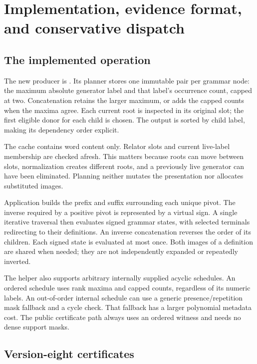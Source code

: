\section{Implementation, evidence format, and conservative dispatch}
\label{sec:implementation}

\subsection{The implemented operation}

The new producer is . Its planner stores
one immutable pair per grammar node: the maximum absolute generator label
and that label's occurrence count, capped at two. Concatenation retains the
larger maximum, or adds the capped counts when the maxima agree. Each
current root is inspected in its original slot; the first eligible donor
for each child is chosen. The output is sorted by child label, making its
dependency order explicit.

The cache contains word content only. Relator slots and current live-label
membership are checked afresh. This matters because roots can move between
slots, normalization creates different roots, and a previously live
generator can have been eliminated. Planning neither mutates the
presentation nor allocates substituted images.

Application builds the prefix and suffix surrounding each unique pivot.
The inverse required by a positive pivot is represented by a virtual sign.
A single iterative traversal then evaluates signed grammar states, with
selected terminals redirecting to their definitions. An inverse
concatenation reverses the order of its children. Each signed state is
evaluated at most once. Both images of a definition are shared when needed;
they are not independently expanded or repeatedly inverted.

The helper also supports arbitrary internally supplied acyclic schedules.
An ordered schedule uses rank maxima and capped counts, regardless of its
numeric labels. An out-of-order internal schedule can use a generic
presence/repetition mask fallback and a cycle check. That fallback has a
larger polynomial metadata cost. The public certificate path always uses
an ordered witness and needs no dense support masks.

\subsection{Version-eight certificates}

